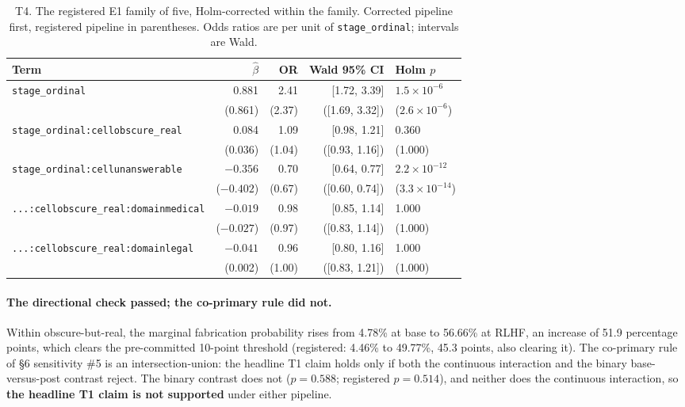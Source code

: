 \begin{table}[t]
\centering
\small
\caption{T4. The registered E1 family of five, Holm-corrected within the family.
Corrected pipeline first, registered pipeline in parentheses. Odds ratios are
per unit of \texttt{stage\_ordinal}; intervals are Wald.}
\label{tab:t4}
\begin{tabular}{lrrrl}
\toprule
Term & $\hat\beta$ & OR & Wald 95\% CI & Holm $p$ \\
\midrule
\texttt{stage\_ordinal}
  & 0.881 & 2.41 & [1.72, 3.39] & $1.5\times10^{-6}$ \\
  & (0.861) & (2.37) & ([1.69, 3.32]) & ($2.6\times10^{-6}$) \\
\texttt{stage\_ordinal:cellobscure\_real}
  & 0.084 & 1.09 & [0.98, 1.21] & 0.360 \\
  & (0.036) & (1.04) & ([0.93, 1.16]) & (1.000) \\
\texttt{stage\_ordinal:cellunanswerable}
  & $-0.356$ & 0.70 & [0.64, 0.77] & $2.2\times10^{-12}$ \\
  & ($-0.402$) & (0.67) & ([0.60, 0.74]) & ($3.3\times10^{-14}$) \\
\texttt{...:cellobscure\_real:domainmedical}
  & $-0.019$ & 0.98 & [0.85, 1.14] & 1.000 \\
  & ($-0.027$) & (0.97) & ([0.83, 1.14]) & (1.000) \\
\texttt{...:cellobscure\_real:domainlegal}
  & $-0.041$ & 0.96 & [0.80, 1.16] & 1.000 \\
  & (0.002) & (1.00) & ([0.83, 1.21]) & (1.000) \\
\bottomrule
\end{tabular}
\end{table}

\paragraph{The directional check passed; the co-primary rule did not.}
Within obscure-but-real, the marginal fabrication probability rises from 4.78\%
at base to 56.66\% at RLHF, an increase of 51.9 percentage points, which clears
the pre-committed 10-point threshold (registered: 4.46\% to 49.77\%, 45.3
points, also clearing it). The co-primary rule of §6 sensitivity \#5 is an
intersection-union: the headline T1 claim holds only if both the continuous
interaction and the binary base-versus-post contrast reject. The binary contrast
does not ($p = 0.588$; registered $p = 0.514$), and neither does the continuous
interaction, so \textbf{the headline T1 claim is not supported} under either
pipeline.

